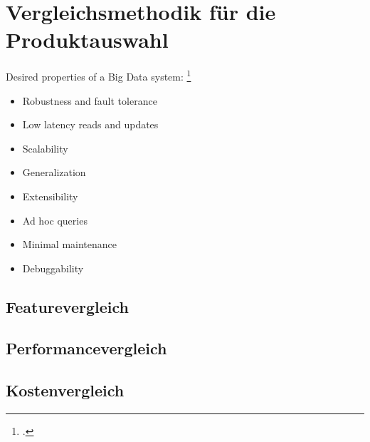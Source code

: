 \section{Vergleichsmethodik für die Produktauswahl}\label{chap:vergleichsmethodik}

Desired properties of a Big Data system: \footcite[Vgl.][S.~7-9]{Marz.2015}
\begin{itemize}
\item Robustness and fault tolerance
\item Low latency reads and updates
\item Scalability
\item Generalization
\item Extensibility
\item Ad hoc queries
\item Minimal maintenance
\item Debuggability
\end{itemize}


\subsection{Featurevergleich}

\subsection{Performancevergleich}

\subsection{Kostenvergleich}